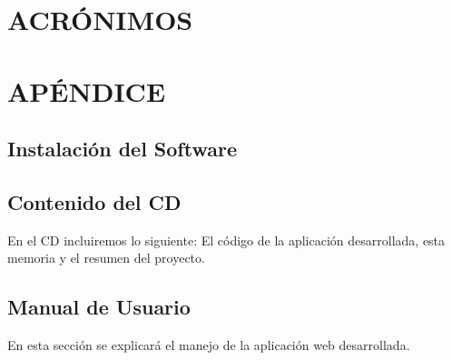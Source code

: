 \documentclass[12pt, a4paper, twoside]{book}
\begin{document}
	\chapter{ACRÓNIMOS}

	\appendix
	\chapter{APÉNDICE}
	\section{Instalación del Software}

	
	\section{Contenido del CD}
	En el CD incluiremos lo siguiente: El código de la aplicación desarrollada, esta memoria y el resumen del proyecto.
	\section{Manual de Usuario}
	En esta sección se explicará el manejo de la aplicación web desarrollada.
		
	
\end{document}
